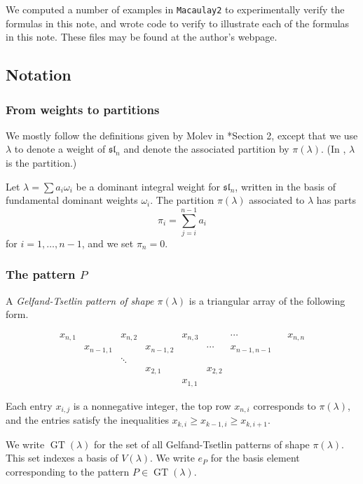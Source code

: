 \documentclass{amsart}[12pt]
\theoremstyle{definition}
\numberwithin{equation}{section}
\newcommand{\GT}{\operatorname{GT}}
\begin{document}
We computed a number of examples in \texttt{Macaulay2} to
experimentally verify the formulas in this note, and wrote code to verify to illustrate
each of the formulas in this note. These files may be found at the author's
webpage.  

\subsection{Notation} \label{sec:Notation}

\subsubsection{From weights to partitions}

We mostly follow the definitions given by Molev in \cite{Molev2006}*{Section 2},
except that we use $\lambda$ to denote a weight of $\mathfrak{sl}_n$
and denote the associated partition by $\pi(\lambda)$. (In \cite{Molev2006},
$\lambda$ is the partition.)



Let $\lambda = \sum a_i \omega_i$ be a dominant integral weight for
$\mathfrak{sl}_n$, written in the basis of fundamental
dominant weights $\omega_i$. The partition $\pi(\lambda)$ associated
to $\lambda$ has parts
\[
  \pi_i = \sum_{j=i}^{n-1} a_i
\]
for $i=1,\ldots,n-1$, and we set $\pi_n=0$. 

\subsubsection{The pattern $P$}
A \emph{Gelfand-Tsetlin pattern of shape  $\pi(\lambda)$} is a triangular array of the following form.

\[\begin{array}{ccccccccc} x_{n,1} & & x_{n,2} & & x_{n,3} & & \cdots
    && x_{n,n} \\ &x_{n-1,1} & & x_{n-1,2} & & \cdots & x_{n-1,n-1} &
    \\ && \ddots \\ && & x_{2,1} && x_{2,2} \\ &&&& x_{1,1}\end{array}
\]

Each entry $x_{i,j}$ is a nonnegative integer, the top row $x_{n,i}$ corresponds to $\pi(\lambda)$, and the entries satisfy the inequalities $x_{k,i} \geq x_{k-1,i} \geq x_{k,i+1}$. 

We write $\GT(\lambda)$ for the set of all Gelfand-Tsetlin patterns of
shape $\pi(\lambda)$. This set indexes a basis of $V(\lambda)$.  We write
$e_P$ for the basis element corresponding to the pattern $P \in \GT(\lambda)$.
\end{document}
